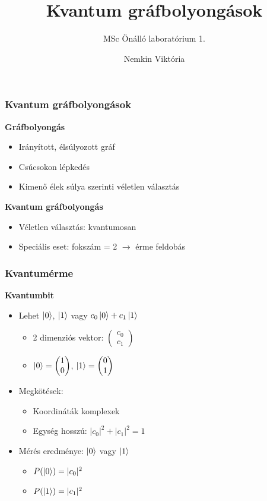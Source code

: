 \documentclass[aspectratio=169]{beamer}
\author{Nemkin Viktória}
\institute{Konzulens: dr. Friedl Katalin}
\title{Kvantum gráfbolyongások}
\subtitle{MSc Önálló laboratórium 1.}
\date{}
\begin{document}
\frame{\titlepage}

\begin{frame}
  \frametitle{Kvantum gráfbolyongások}
  \textbf{Gráfbolyongás}
  \begin{itemize}
    \item Irányított, élsúlyozott gráf
    \item Csúcsokon lépkedés
    \item Kimenő élek súlya szerinti véletlen választás
  \end{itemize}
  \pause
  \textbf{Kvantum gráfbolyongás}
  \begin{itemize}
    \item Véletlen választás: kvantumosan
    \item Speciális eset: fokszám = 2 $\rightarrow$ érme feldobás
  \end{itemize}
\end{frame}

\begin{frame}
  \frametitle{Kvantumérme}
  \textbf{Kvantumbit}
  \begin{itemize}
    \item Lehet $\ket{0}$, $\ket{1}$ vagy $c_0\ket{0} + c_1\ket{1}$
          \begin{itemize}
            \item 2 dimenziós vektor: $\begin{pmatrix} c_0 \\ c_1 \end{pmatrix}$
            \item $\ket{0} = \begin{pmatrix} 1 \\ 0\end{pmatrix}$, $\ket{1} = \begin{pmatrix} 0 \\ 1\end{pmatrix}$
          \end{itemize}
          \pause
    \item Megkötések:
          \begin{itemize}
            \item Koordináták komplexek
            \item Egység hosszú: $|c_0|^2 + |c_1|^2 = 1$
          \end{itemize}
          \pause
    \item Mérés eredménye: $\ket{0}$ vagy $\ket{1}$
          \begin{itemize}
            \item $P(\ket{0}) = |c_0|^2$
            \item $P(\ket{1}) = |c_1|^2$
          \end{itemize}
  \end{itemize}
\end{frame}
\end{document}
